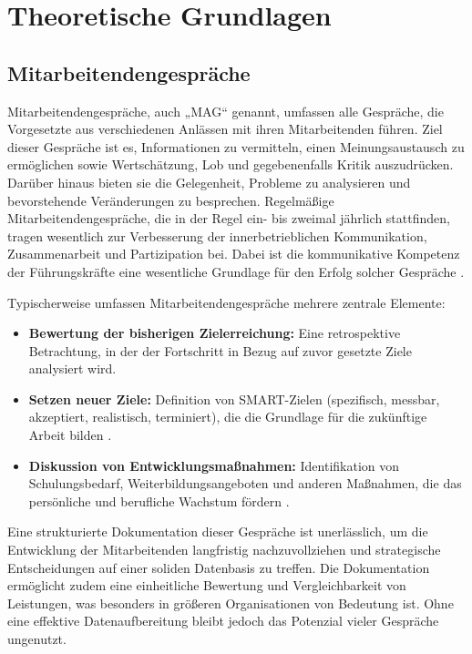 \chapter{Theoretische Grundlagen}
\label{chap:theoretische-grundlagen}

\section{Mitarbeitendengespräche}
Mitarbeitendengespräche, auch „MAG“ genannt, umfassen alle Gespräche, die Vorgesetzte aus verschiedenen Anlässen mit ihren Mitarbeitenden führen. Ziel dieser Gespräche ist es, Informationen zu vermitteln, einen Meinungsaustausch zu ermöglichen sowie Wertschätzung, Lob und gegebenenfalls Kritik auszudrücken. Darüber hinaus bieten sie die Gelegenheit, Probleme zu analysieren und bevorstehende Veränderungen zu besprechen. Regelmäßige Mitarbeitendengespräche, die in der Regel ein- bis zweimal jährlich stattfinden, tragen wesentlich zur Verbesserung der innerbetrieblichen Kommunikation, Zusammenarbeit und Partizipation bei. Dabei ist die kommunikative Kompetenz der Führungskräfte eine wesentliche Grundlage für den Erfolg solcher Gespräche \cite{schober2008}.

Typischerweise umfassen Mitarbeitendengespräche mehrere zentrale Elemente:
\begin{itemize}
    \item \textbf{Bewertung der bisherigen Zielerreichung:} Eine retrospektive Betrachtung, in der der Fortschritt in Bezug auf zuvor gesetzte Ziele analysiert wird.
    \item \textbf{Setzen neuer Ziele:} Definition von SMART-Zielen (spezifisch, messbar, akzeptiert, realistisch, terminiert), die die Grundlage für die zukünftige Arbeit bilden \cite{duarte2012performance}.
    \item \textbf{Diskussion von Entwicklungsmaßnahmen:} Identifikation von Schulungsbedarf, Weiterbildungsangeboten und anderen Maßnahmen, die das persönliche und berufliche Wachstum fördern \cite{bryson2011employee}.
\end{itemize}

Eine strukturierte Dokumentation dieser Gespräche ist unerlässlich, um die Entwicklung der Mitarbeitenden langfristig nachzuvollziehen und strategische Entscheidungen auf einer soliden Datenbasis zu treffen. Die Dokumentation ermöglicht zudem eine einheitliche Bewertung und Vergleichbarkeit von Leistungen, was besonders in größeren Organisationen von Bedeutung ist. Ohne eine effektive Datenaufbereitung bleibt jedoch das Potenzial vieler Gespräche ungenutzt.

